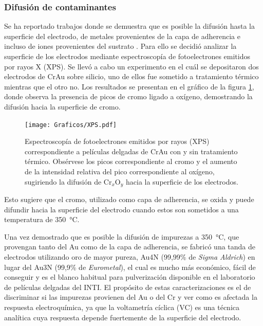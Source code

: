 		\subsubsection{Difusión de contaminantes}

			Se ha reportado trabajos donde se demuestra que es posible la difusión hasta la superficie del electrodo, de metales provenientes de la capa de adherencia e incluso de iones provenientes del sustrato \cite{Alonso1990,Moody2003}. Para ello se decidió analizar la superficie de los electrodos mediante espectroscopía de fotoelectrones emitidos por rayos X (XPS). Se llevó a cabo un experimento en el cuál se depositaron dos electrodos de Cr\textbar Au sobre silicio, uno de ellos fue sometido a tratamiento térmico mientras que el otro no. Los resultados se presentan en el gráfico de la figura \ref{fig:XPS}, donde observa la presencia de picos de cromo ligado a oxígeno, demostrando la difusión hacia la superficie de cromo.
				
				\begin{figure}[hb!]
		 	       	\begin{center}
		 	       	\texttt{[image: Graficos/XPS.pdf]}
		        	\caption[XPS de películas delgadas de Cr\textbar Au]{Espectroscopía de fotoelectrones emitidos por rayos (XPS) correspondiente a películas delgadas de Cr\textbar Au con y sin tratamiento térmico. Obsérvese los picos correspondiente al cromo y el aumento de la intensidad relativa del pico correspondiente al oxígeno, sugiriendo la difusión de Cr$_x$O$_y$ hacia la superficie de los electrodos.}
		         	\label{fig:XPS}
		         	\end{center}
		     		\end{figure}

			Esto sugiere que el cromo, utilizado como capa de adherencia, se oxida y puede difundir hacia la superficie del electrodo cuando estos son sometidos a una temperatura de \SI{350}{\celsius}.

			Una vez demostrado que es posible la difusión de impurezas a \SI{350}{\celsius}, que provengan tanto del Au como de la capa de adherencia, se fabricó una tanda de electrodos utilizando oro de mayor pureza, Au4N (99,99\% de \textit{Sigma Aldrich}) en lugar del Au3N (99,9\% de \textit{Eurometal}), el cual es mucho más económico, fácil de conseguir y es el blanco habitual para pulverización disponible en el laboratorio de películas delgadas del INTI. El propósito de estas caracterizaciones es el de discriminar si las impurezas provienen del Au o del Cr y ver como es afectada la respuesta electroquímica, ya que la voltametría cíclica (VC) es una técnica analítica cuya respuesta depende fuertemente de la superficie del electrodo.\cite{Wi2000,Pumera2007,Gewirth2004,Villullas2000}

